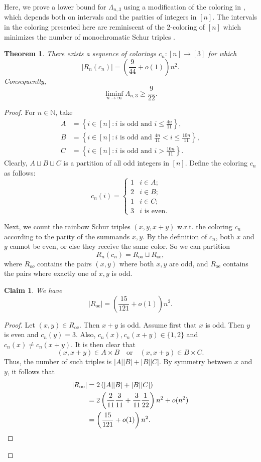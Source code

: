 \documentclass[11pt]{article}
\theoremstyle{plain}
\newtheorem{theorem}{Theorem}[section]
\newtheorem{claim}{Claim}[section]
\numberwithin{equation}{section}
\begin{document}
Here, we prove a lower bound for $\Lambda_{n,3}$ using a modification of the coloring in \cite{Parczyk_Spiegel_2026}, which depends both on intervals and the parities of integers in $[n]$. The intervals in the coloring presented here are reminiscent of the 2-coloring of $[n]$ which minimizes the number of monochromatic Schur triples \cite{ Datskovsky_2003, Robertson_Zeilberger_1998, Schoen_1999}.

\begin{theorem}\label{thm:lower_bound_3_color}
There exists a sequence of colorings $c_n:[n]\to [3]$ for which
\[
|R_n(c_n)|
=
\left(\frac{9}{44}+o(1)\right)n^2.
\]
Consequently,
\[
\liminf_{n\to \infty} \Lambda_{n,3}\ge \frac{9}{22}.
\]
\end{theorem}
\begin{proof}
For $n\in \mathbb{N}$, take
\begin{align*}
A& =\left\{i\in[n]: i\text{ is odd and }i\leq\frac{4n}{11}\right\},\\
B& =\left\{i\in[n]: i\text{ is odd and }
\frac{4n}{11}<i\leq\frac{10n}{11}\right\},\\
C&=\left\{i\in[n]: i\text{ is odd and }i>\frac{10n}{11}\right\}.
\end{align*}
Clearly, $A\sqcup B\sqcup C$ is a partition of all odd integers in $[n]$. Define the coloring $c_n$ as follows:
\[
c_n(i)=
\begin{cases}
1 & i\in A;\\
2 & i\in B;\\
1 & i\in C;\\
3 &  i \text{ is even}.
\end{cases}
\]

Next, we count the rainbow Schur triples $(x,y,x+y)$ w.r.t. the coloring $c_n$ according to the parity of the summands $x,y$. By the definition of $c_n$, both $x$ and $y$ cannot be even, or else they receive the same color. So we can partition
\[ R_n(c_n) = R_{\mathrm{oo}} \sqcup R_{\mathrm{oe}},\]
where $R_{oo}$ contains the pairs $(x,y)$ where both $x,y$ are odd, and $R_{\mathrm{oe}}$ contains the pairs where exactly one of $x,y$ is odd. 

\begin{claim}\label{claim:R_oe} We have 
\[|R_{\mathrm{oe}}| = \left(\frac{15}{121}+o(1)\right)n^2.\]
\end{claim}

\begin{proof}
Let $(x,y)\in R_{\mathrm{oe}}$. Then $x+y$ is odd. Assume first that $x$ is odd. Then $y$ is even and $c_n(y)=3$. Also, $c_n(x), c_n(x+y)\in \{1,2\}$ and $c_n(x)\neq c_n(x+y)$. It is then clear that 
\[ (x,x+y)\in A\times B \quad \text{or} \quad (x,x+y)\in B\times C.\]
Thus, the number of such triples is $|A||B| + |B||C|$. By symmetry between $x$ and $y$, it follows that 
\begin{align*}
    |R_{\mathrm{oe}}| & = 2\left(|A||B| + |B||C|\right)\\
    & = 2\left(\frac{2}{11}\frac{3}{11}+\frac{3}{11}\frac{1}{22}\right)n^2+o(n^2)\\
    &=\left(\frac{15}{121}+o(1)\right)n^2.\qedhere
\end{align*}
\end{proof}


\end{proof}
\end{document}
